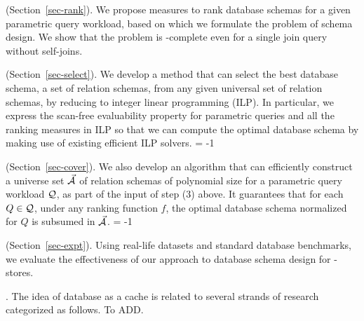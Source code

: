 { (Section~\ref{sec-rank}).
We propose measures to rank \baav database schemas for a
given parametric query workload, based on which we formulate the
problem of \baav schema design. We show that the problem is
\NP-complete even for a single join query without self-joins.

 (Section~\ref{sec-select}). 
We develop a method that can select the best \baav database
schema, \ie a set of \baav relation schemas, from any given
universal set of \baav relation schemas, by reducing to integer
linear programming (ILP). In particular, we express the scan-free
evaluability property for parametric queries and all the ranking
measures in ILP so that we can compute the optimal \baav database
schema by making use of existing efficient ILP solvers.
\looseness = -1

 (Section~\ref{sec-cover}).
We also develop an algorithm that can efficiently construct a
universe set $\vec{{\mathcal A}}$ of \baav relation schemas of polynomial
size for a parametric query workload $\mathcal Q$, as part of the input
of step (3) above. It guarantees that for each $Q\in \mathcal Q$, under
any ranking function $f$, the optimal \baav database schema
normalized for $Q$ is subsumed in $\vec{{\mathcal A}}$.
\looseness = -1

 (Section~\ref{sec-expt}). 
Using real-life datasets and standard database benchmarks, we evaluate
the effectiveness of our approach to \baav database schema design
for \kv-stores. 


. The idea of database as a cache is related
to several strands of research categorized as follows.  To ADD.


}
